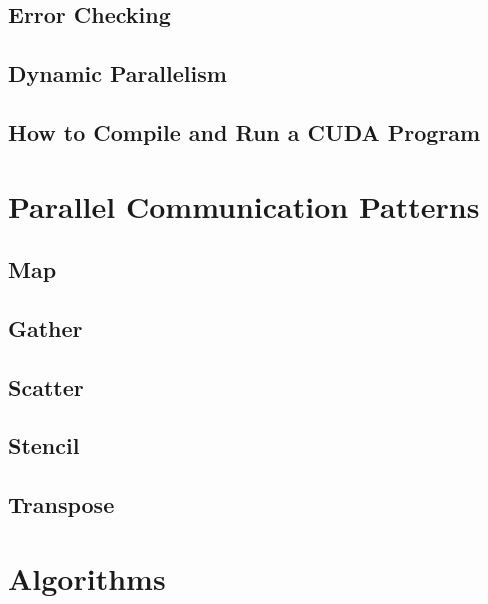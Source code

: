 \documentclass[12px,oz]{report}
\theoremstyle{indented}
\theoremstyle{indented}
\def \cuda {CUDA}
\begin{document}
	\section{Error Checking}
	\label{sec-pm-error-checkng}
	
	
	\section{Dynamic Parallelism}
	\label{sec-pm-dynamic}
	
	
	\section{How to Compile and Run a \cuda{} Program}
	\label{sec-pm-compile-run}
	


\chapter{Parallel Communication Patterns}
\label{ch-patterns}

	
	\section{Map}
	\label{sec-map}
	
	
	\section{Gather}
	\label{sec-gather}
	
	
	\section{Scatter}
	\label{sec-scatter}
	
	
	\section{Stencil}
	\label{sec-stencil}
	
	
	\section{Transpose}
	\label{sec-transpose}
	
	
\chapter{Algorithms}
\label{ch:algorithms}

\end{document}
